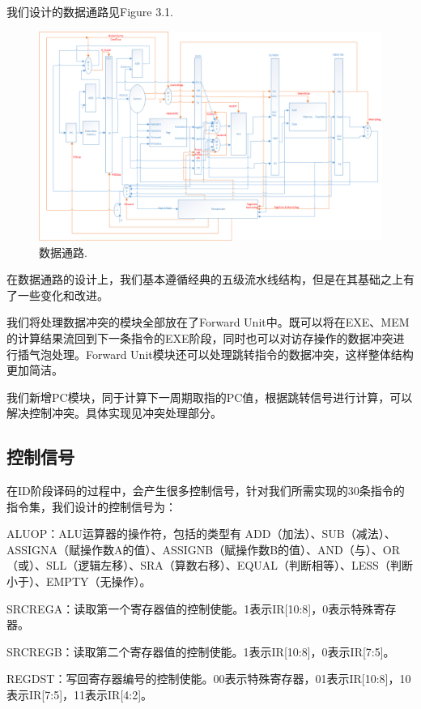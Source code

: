 我们设计的数据通路见Figure 3.1.
\begin{figure}[H]
  \includegraphics[width=\linewidth]{Figures/datapath.png}
  \caption{数据通路.}
\end{figure}

在数据通路的设计上，我们基本遵循经典的五级流水线结构，但是在其基础之上有了一些变化和改进。

我们将处理数据冲突的模块全部放在了Forward Unit中。既可以将在EXE、MEM的计算结果流回到下一条指令的EXE阶段，同时也可以对访存操作的数据冲突进行插气泡处理。Forward Unit模块还可以处理跳转指令的数据冲突，这样整体结构更加简洁。

我们新增PC模块，同于计算下一周期取指的PC值，根据跳转信号进行计算，可以解决控制冲突。具体实现见冲突处理部分。


\subsection{控制信号}
在ID阶段译码的过程中，会产生很多控制信号，针对我们所需实现的30条指令的指令集，我们设计的控制信号为：

ALUOP：ALU运算器的操作符，包括的类型有 ADD（加法）、SUB（减法）、ASSIGNA（赋操作数A的值）、ASSIGNB（赋操作数B的值）、AND（与）、OR（或）、SLL（逻辑左移）、SRA（算数右移）、EQUAL（判断相等）、LESS（判断小于）、EMPTY（无操作）。

SRCREGA：读取第一个寄存器值的控制使能。1表示IR[10:8]，0表示特殊寄存器。

SRCREGB：读取第二个寄存器值的控制使能。1表示IR[10:8]，0表示IR[7:5]。

REGDST：写回寄存器编号的控制使能。00表示特殊寄存器，01表示IR[10:8]，10表示IR[7:5]，11表示IR[4:2]。

